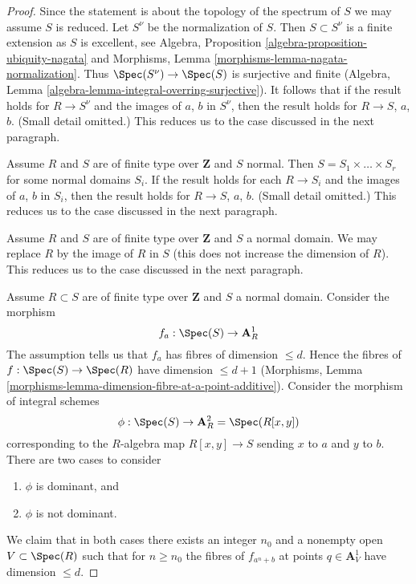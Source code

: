 \begin{proof}
\medskip\noindent
Since the statement is about the topology of the spectrum of $S$
we may assume $S$ is reduced. Let $S^\nu$ be the normalization of $S$.
Then $S \subset S^\nu$ is a finite extension as $S$ is excellent, see
Algebra, Proposition \ref{algebra-proposition-ubiquity-nagata}
and Morphisms, Lemma \ref{morphisms-lemma-nagata-normalization}.
Thus $\Spec(S^\nu) \to \Spec(S)$ is surjective and finite
(Algebra, Lemma \ref{algebra-lemma-integral-overring-surjective}).
It follows that if the result holds for $R \to S^\nu$ and the
images of $a$, $b$ in $S^\nu$, then the result holds for $R \to S$, $a$, $b$.
(Small detail omitted.) This reduces us to the case discussed in the
next paragraph.

\medskip\noindent
Assume $R$ and $S$ are of finite type over $\mathbf{Z}$ and
$S$ normal. Then $S = S_1 \times \ldots \times S_r$ for some
normal domains $S_i$. If the result holds for each $R \to S_i$
and the images of $a$, $b$ in $S_i$, then the result holds for
$R \to S$, $a$, $b$. (Small detail omitted.)
This reduces us to the case discussed in the next paragraph.

\medskip\noindent
Assume $R$ and $S$ are of finite type over $\mathbf{Z}$ and
$S$ a normal domain. We may replace $R$ by the image of $R$ in $S$
(this does not increase the dimension of $R$).
This reduces us to the case discussed in the next paragraph.

\medskip\noindent
Assume $R \subset S$ are of finite type over $\mathbf{Z}$ and
$S$ a normal domain. Consider the morphism
$$
f_a : \Spec(S) \to \mathbf{A}^1_R
$$
The assumption tells us that $f_a$ has fibres of dimension $\leq d$.
Hence the fibres of $f : \Spec(S) \to \Spec(R)$ have dimension $\leq d + 1$
(Morphisms, Lemma \ref{morphisms-lemma-dimension-fibre-at-a-point-additive}).
Consider the morphism of integral schemes
$$
\phi : \Spec(S) \to \mathbf{A}^2_R = \Spec(R[x, y])
$$
corresponding to the $R$-algebra map $R[x, y] \to S$ sending $x$ to $a$
and $y$ to $b$. There are two cases to consider
\begin{enumerate}
\item $\phi$ is dominant, and
\item $\phi$ is not dominant.
\end{enumerate}
We claim that in both cases there exists an integer $n_0$
and a nonempty open $V \subset \Spec(R)$ such that for $n \geq n_0$
the fibres of $f_{a^n + b}$ at points $q \in \mathbf{A}^1_V$
have dimension $\leq d$.


\end{proof}
